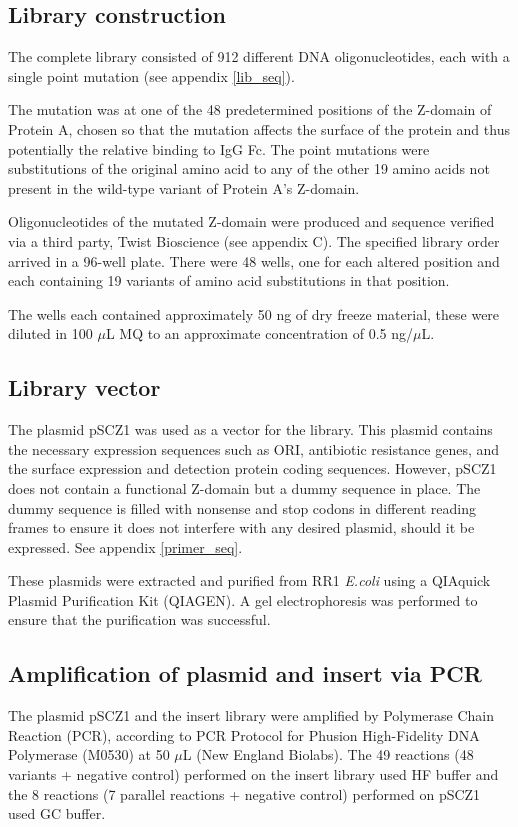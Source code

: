 \documentclass{article}
\begin{document}
\begin{multicols}{2}
	\subsection{Library construction}
	\label{met_lib_cons}
	The complete library consisted of 912 different DNA oligonucleotides, each with a single point mutation (see appendix \ref{lib_seq}).
	
	The mutation was at one of the 48 predetermined positions of the Z-domain of Protein A, chosen so that the mutation affects the surface of the protein and thus potentially the relative binding to IgG Fc. The point mutations were substitutions of the original amino acid to any of the other 19 amino acids not present in the wild-type variant of Protein A’s Z-domain.
	
	Oligonucleotides of the mutated Z-domain were produced and sequence verified via a third party, Twist Bioscience (see appendix C). The specified library order arrived in a 96-well plate. There were 48 wells, one for each altered position and each containing 19 variants of amino acid substitutions in that position. 
	
	The wells each contained approximately 50 ng of dry freeze material, these were diluted in 100 $\mu$L MQ to an approximate concentration of 0.5 ng/$\mu$L.
	

	\subsection{Library vector}
	The plasmid pSCZ1 \cite{fleetwood_simultaneous_2015} was used as a vector for the library. This plasmid contains the necessary expression sequences such as ORI, antibiotic resistance genes, and the surface expression and detection protein coding sequences. However, pSCZ1 does not contain a functional Z-domain but a dummy sequence in place. The dummy sequence is filled with nonsense and stop codons in different reading frames to ensure it does not interfere with any desired plasmid, should it be expressed. See appendix \ref{primer_seq}. 
	
	These plasmids were extracted and purified from RR1 \textit{E.coli} using a QIAquick Plasmid Purification Kit (QIAGEN). A gel electrophoresis was performed to ensure that the purification was successful.
	
	\subsection{Amplification of plasmid and insert via PCR}
	The plasmid pSCZ1 and the insert library were amplified by Polymerase Chain Reaction (PCR), according to PCR Protocol for Phusion \textregistered High-Fidelity DNA Polymerase (M0530) at 50 $\mu$L (New England Biolabs). The 49 reactions (48 variants + negative control) performed on the insert library used HF buffer and the 8 reactions (7 parallel reactions + negative control) performed on pSCZ1 used GC buffer.
	

\end{multicols}
\end{document}
